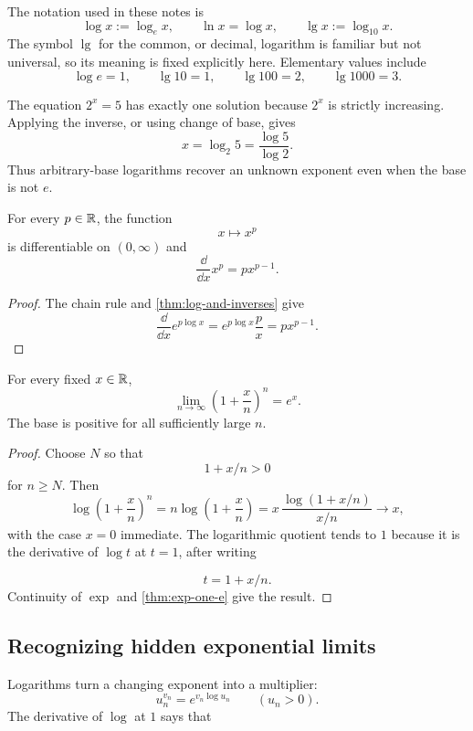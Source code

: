 The notation used in these notes is
\[
\boxed{\log x:=\log_e x},
\qquad
\ln x=\log x,
\qquad
\boxed{\lg x:=\log_{10}x}.
\]
The symbol $\lg$ for the common, or decimal, logarithm is familiar but not
universal, so its meaning is fixed explicitly here. Elementary values include
\[
\log e=1,
\qquad
\lg10=1,
\qquad
\lg100=2,
\qquad
\lg1000=3.
\]

\begin{example}
The equation $2^x=5$ has exactly one solution because $2^x$ is strictly
increasing. Applying the inverse, or using change of base, gives
\[
x=\log_2 5=\frac{\log5}{\log2}.
\]
Thus arbitrary-base logarithms recover an unknown exponent even when the
base is not \(e\).
\end{example}

\begin{theorem}
\label{thm:real-power-derivative}
For every $p\in\mathbb{R}$, the function
\[
x\longmapsto x^p
\]
is differentiable on $(0,\infty)$ and
\[
\frac{\dd}{\dd x}x^p=px^{p-1}.
\]
\end{theorem}
\begin{proof}
The chain rule and \cref{thm:log-and-inverses} give
\[
\frac{\dd}{\dd x}e^{p\log x}
=e^{p\log x}\frac{p}{x}
=px^{p-1}.
\]
\end{proof}

\begin{proposition}
\label{prop:exp-binomial-limit}
For every fixed \(x\in\mathbb{R}\),
\[
\lim_{n\to\infty}\left(1+\frac xn\right)^n=e^x.
\]
The base is positive for all sufficiently large \(n\).
\end{proposition}
\begin{proof}
Choose \(N\) so that
\[
1+x/n>0
\]
 for \(n\geq N\). Then
\[
\log\left(1+\frac xn\right)^n
=n\log\left(1+\frac xn\right)
=x\,\frac{\log(1+x/n)}{x/n}
\longrightarrow x,
\]
with the case \(x=0\) immediate. The logarithmic quotient tends to \(1\)
because it is the derivative of \(\log t\) at \(t=1\), after writing

\[
t=1+x/n.
\]
 Continuity of \(\exp\) and \cref{thm:exp-one-e} give the result.
\end{proof}

\subsection*{Recognizing hidden exponential limits}
Logarithms turn a changing exponent into a multiplier:
\[
u_n^{v_n}=e^{v_n\log u_n}\qquad(u_n>0).
\]
The derivative of $\log$ at $1$ says that


